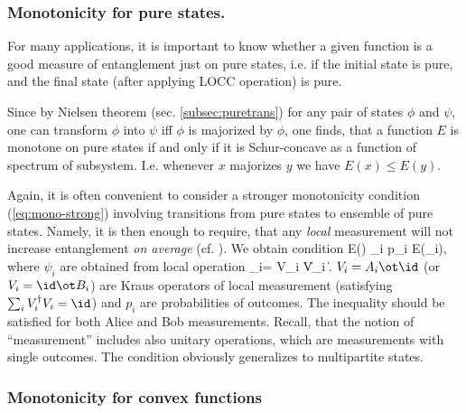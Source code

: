 \documentclass[twocolumn,aps,rmp]{revtex4}
\begin{document}
\subsubsection{Monotonicity for pure states.}
\label{subsubsec:monot_pur}
For many applications, it is important to know whether a given function is a good measure
of entanglement just  on pure states, i.e. if the initial state is pure,
and the final state (after applying LOCC operation) is pure.

Since by Nielsen theorem (sec. \ref{subsec:puretrans}) for any pair
of states $\phi$ and $\psi$,
one can transform $\phi$ into $\psi$ iff  $\phi$ is majorized by $\phi$,
one finds, that a function $E$ is monotone on pure states
if and only if it is Schur-concave as a function of spectrum
of subsystem. I.e. whenever $x$ majorizes $y$ we have $E(x)\leq E(y)$.

Again, it is often convenient to consider a stronger monotonicity
condition (\ref{eq:mono-strong}) involving  transitions from pure
states to ensemble of pure states. Namely, it is then enough to
require, that any {\it local} measurement will not increase
entanglement {\it on average} (cf. \cite{LPSW1999}). We obtain condition
\be
E(\psi) \geq \sum_i p_i E(\psi_i), \label{eq:mono-pure}
\ee
where
$\psi_i$ are obtained from  local operation \be \psi_i= {V_i \psi
\over \|V_i \psi\|}. \ee $V_i=A_i\ot \id $ (or $V_i = \id\ot B_i$) are
Kraus operators of local  measurement (satisfying $\sum_i
V_i^\dagger V_i=\id$) and $p_{i}$ are probabilities of
outcomes. The inequality should be satisfied for both Alice
and Bob measurements. Recall, that the notion of ``measurement''
includes also unitary operations, which are measurements with single
outcomes. The condition obviously generalizes to multipartite
states.









\subsubsection{Monotonicity for convex functions}
\label{mono-convex}
\end{document}
